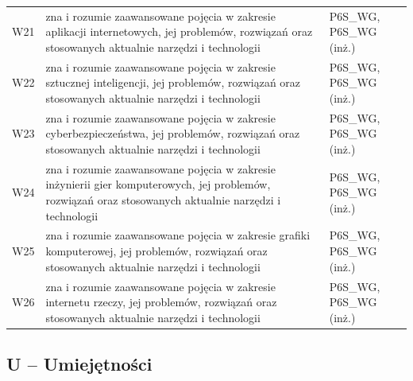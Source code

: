 \documentclass[12pt,a4paper]{article}
\begin{document}
{\begin{longtable}{m{1cm}m{9.5cm}m{3.9cm}}
\rowcolor{tableRowLight} W21 & zna i rozumie zaawansowane pojęcia w zakresie aplikacji internetowych, jej problemów, rozwiązań oraz stosowanych aktualnie narzędzi i technologii & {\scriptsize P6S\_WG, P6S\_WG {\scriptsize (inż.)}} \\
\rowcolor{tableRowAlt} W22 & zna i rozumie zaawansowane pojęcia w zakresie sztucznej inteligencji, jej problemów, rozwiązań oraz stosowanych aktualnie narzędzi i technologii & {\scriptsize P6S\_WG, P6S\_WG {\scriptsize (inż.)}} \\
\rowcolor{tableRowLight} W23 & zna i rozumie zaawansowane pojęcia w zakresie cyberbezpieczeństwa, jej problemów, rozwiązań oraz stosowanych aktualnie narzędzi i technologii & {\scriptsize P6S\_WG, P6S\_WG {\scriptsize (inż.)}} \\
\rowcolor{tableRowAlt} W24 & zna i rozumie zaawansowane pojęcia w zakresie inżynierii gier komputerowych, jej problemów, rozwiązań oraz stosowanych aktualnie narzędzi i technologii & {\scriptsize P6S\_WG, P6S\_WG {\scriptsize (inż.)}} \\
\rowcolor{tableRowLight} W25 & zna i rozumie zaawansowane pojęcia w zakresie grafiki komputerowej, jej problemów, rozwiązań oraz stosowanych aktualnie narzędzi i technologii & {\scriptsize P6S\_WG, P6S\_WG {\scriptsize (inż.)}} \\
\rowcolor{tableRowAlt} W26 & zna i rozumie zaawansowane pojęcia w zakresie internetu rzeczy, jej problemów, rozwiązań oraz stosowanych aktualnie narzędzi i technologii & {\scriptsize P6S\_WG, P6S\_WG {\scriptsize (inż.)}} \\
\bottomrule
\end{longtable}}

\subsection*{U -- Umiejętności}
\end{document}
